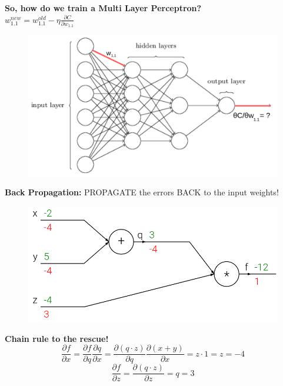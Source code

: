 \documentclass[10pt, compress]{beamer}
\begin{document}
\begin{frame}
  \vspace{1cm}
  \textbf{So, how do we train a Multi Layer Perceptron?} \\
  \Large{$w_{1.1}^{new} = w_{1.1}^{old} - \eta \frac{\partial C}{\partial w_{1.1}}$}
  \begin{figure}
    \includegraphics[width=.8\linewidth]{imgs/mlp_backprop}
  \end{figure}
\end{frame}

\begin{frame}
  \vspace{1cm}
  \textbf{Back Propagation:} PROPAGATE the errors BACK to the input weights! \\
  \begin{figure}
    \includegraphics[width=.7\linewidth]{imgs/backprop_1}
  \end{figure}
  \textbf{Chain rule to the rescue!} \\
  $$\frac{\partial f}{\partial x} = \frac{\partial f}{\partial q} \frac{\partial q}{\partial x} =  \frac{\partial (q \cdot z)}{\partial q} \frac{\partial (x + y)}{\partial x} =
  z \cdot 1 = z = -4$$
  $$\frac{\partial f}{\partial z} = \frac{\partial (q \cdot z)}{\partial z} = q = 3$$
\end{frame}
\end{document}
